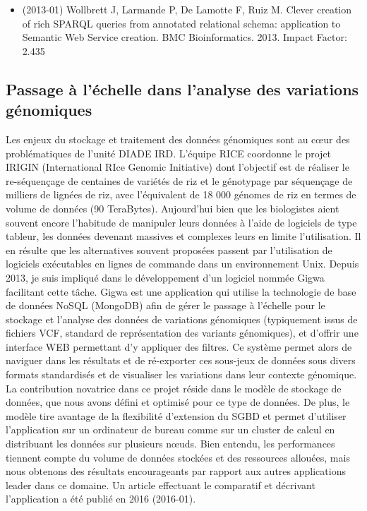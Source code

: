 \begin{itemize}

\item (2013-01) Wollbrett J, Larmande P, De Lamotte F, Ruiz M. Clever creation of rich SPARQL queries from annotated relational schema: application to Semantic Web Service creation. BMC Bioinformatics. 2013. Impact Factor: 2.435
\end{itemize}

\subsection*{Passage à l’échelle dans l’analyse des variations génomiques}
\label{GIGWA}

Les enjeux du stockage et traitement des données génomiques sont au cœur des problématiques de l’unité DIADE IRD. L’équipe RICE coordonne le projet IRIGIN (International RIce Genomic Initiative) dont l’objectif est de réaliser le re-séquençage de centaines de variétés de riz et le génotypage par séquençage de milliers de lignées de riz, avec l’équivalent de 18 000 génomes de riz en termes de volume de données (90 TeraBytes). Aujourd'hui bien que les biologistes aient souvent encore l'habitude de manipuler leurs données à l'aide de logiciels de type tableur, les données devenant massives et complexes leurs en limite l'utilisation. Il en résulte que les alternatives souvent proposées passent par l’utilisation de logiciels exécutables en lignes de commande dans un environnement Unix.
Depuis 2013, je suis impliqué dans le développement d’un logiciel nommée Gigwa facilitant cette tâche. Gigwa est une application qui utilise la technologie de base de données NoSQL (MongoDB) afin de gérer le passage à l’échelle pour le stockage et l’analyse des données de variations génomiques (typiquement issus de fichiers VCF, standard de représentation des variants génomiques), et d’offrir une interface WEB permettant d’y appliquer des filtres. Ce système permet alors de naviguer dans les résultats et de ré-exporter ces sous-jeux de données sous divers formats standardisés et de visualiser les variations dans leur contexte génomique. La contribution novatrice dans ce projet réside dans le modèle de stockage de données, que nous avons défini et optimisé pour ce type de données. De plus, le modèle tire avantage de la flexibilité d’extension du SGBD et permet d’utiliser l’application sur un ordinateur de bureau comme sur un cluster de calcul en distribuant les données sur plusieurs nœuds. Bien entendu, les performances tiennent compte du volume de données stockées et des ressources allouées, mais nous obtenons des résultats encourageants par rapport aux autres applications leader dans ce domaine. Un article effectuant le comparatif et décrivant l'application a été publié en 2016 (2016-01).

